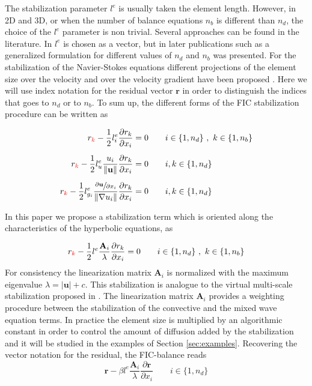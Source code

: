 \documentclass[a4paper,12pt]{elsarticle}
\newcommand{\Miguel}[1]{\textcolor{red}{#1}}
\newcommand{\pder}[2]{\frac{\partial#1}{\partial#2}}
\newcommand{\abs}[1]{\lvert#1\rvert}
\newcommand{\norm}[1]{\lVert#1\rVert}
\begin{document}
The stabilization parameter $l^e$ is usually taken the element length. However, in 2D and 3D, or when the number of balance equations $n_b$ is different than $n_d$, the choice of the $l^e$ parameter is non trivial.
Several approaches can be found in the literature. In \cite{onate1998} $l^e$ is chosen as a vector, but in later publications such as \cite{onate2001} a generalized formulation for different values of $n_d$ and $n_b$ was presented.
For the stabilization of the Navier-Stokes equations different projections of the element size over the velocity and over the velocity gradient have been proposed \cite{cotela2016}. Here we will use index notation for the residual vector $\mathbf{r}$ in order to distinguish the indices that goes to $n_d$ or to $n_b$. To sum up, the different forms of the FIC stabilization procedure can be written as

\begin{subequations}
\begin{align}
r_{\Miguel{k}} - \frac{1}{2}l^e_i\pder{r_k}{x_i} &= 0
    \qquad i\in\{1,n_d\} \ ,\ k\in\{1,n_b\}\\[5pt]
r_{\Miguel{k}} - \frac{1}{2}l^e_u\frac{u_i}{\norm{\mathbf{u}}}\pder{r_k}{x_i} &= 0
    \qquad i,k\in\{1,n_d\}\\[5pt]
r_{\Miguel{k}} - \frac{1}{2}l^e_{g_i}\frac{\sfrac{\partial\mathbf{u}}{\partial x_i}}{\norm{\nabla u_i}}\pder{r_k}{x_i} &= 0
    \qquad i,k\in\{1,n_d\}
\end{align}
\end{subequations}

In this paper we propose a stabilization term which is oriented along the characteristics of the hyperbolic equations, as

\begin{equation} \label{fic_sw}
r_{\Miguel{k}} - \frac{1}{2}l^e\frac{\mathbf{A}_i}{\lambda}\pder{r_k}{x_i} = 0
    \qquad i\in\{1,n_d\} \ ,\ k\in\{1,n_b\}
\end{equation}
For consistency the linearization matrix $\mathbf{A}_i$ is normalized with the maximum eigenvalue $\lambda=\abs{\mathbf{u}} + c$. This stabilization is analogue to the virtual multi-scale stabilization proposed in \cite{codina2008b}. The linearization matrix $\mathbf{A}_i$ provides a weighting procedure between the stabilization of the convective and the mixed wave equation terms. In practice the element size is multiplied by an algorithmic constant in order to control the amount of diffusion added by the stabilization and it will be studied in the examples of Section \ref{sec:examples}. Recovering the vector notation for the residual, the FIC-balance reads
\begin{equation} \label{fic_sw_beta}
\mathbf{r} - \beta l^e\frac{\mathbf{A}_i}{\lambda}\pder{\mathbf{r}}{x_i}
    \qquad i\in\{1,n_d\}
\end{equation}
\end{document}
